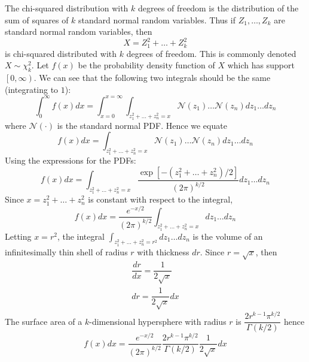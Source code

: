 \documentclass[11pt]{report} %
\begin{document}
The chi-squared distribution with $k$ degrees of freedom is the distribution of the sum of squares of $k$ standard normal random variables. Thus if $Z_{1}, \dots, Z_{k}$ are standard normal random variables, then
\begin{equation}
X = Z_{1}^{2} + \dots + Z_{k}^{2}
\end{equation}
is chi-squared distributed with $k$ degrees of freedom. This is commonly denoted $X \sim \chi_{k}^{2}$. Let $f\left(x\right)$ be the probability density function of $X$ which has support $\left[0, \infty\right)$. We can see that the following two integrals should be the same (integrating to $1$):
\begin{equation}
\int_{0}^{\infty}f\left(x\right)dx = \int_{x = 0}^{x = \infty}\int_{z_{1}^{2} + \dots + z_{n}^{2} = x}\mathcal{N}\left(z_{1}\right)\dots\mathcal{N}\left(z_{n}\right)dz_{1}\dots dz_{n}
\end{equation}
where $\mathcal{N}\left(\cdot\right)$ is the standard normal PDF. Hence we equate
\begin{equation}
f\left(x\right)dx = \int_{z_{1}^{2} + \dots + z_{n}^{2} = x}\mathcal{N}\left(z_{1}\right)\dots\mathcal{N}\left(z_{n}\right)dz_{1}\dots dz_{n}
\end{equation}
Using the expressions for the PDFs:
\begin{equation}
f\left(x\right)dx = \int_{z_{1}^{2} + \dots + z_{n}^{2} = x}\dfrac{\exp\left[-\left(z_{1}^{2} + \dots + z_{n}^{2}\right)/2\right]}{\left(2\pi\right)^{k/2}}dz_{1}\dots dz_{n}
\end{equation}
Since $x = z_{1}^{2} + \dots + z_{n}^{2}$ is constant with respect to the integral,
\begin{equation}
f\left(x\right)dx = \dfrac{e^{-x/2}}{\left(2\pi\right)^{k/2}}\int_{z_{1}^{2} + \dots + z_{n}^{2} = x}dz_{1}\dots dz_{n}
\end{equation}
Letting $x = r^{2}$, the integral $\int_{z_{1}^{2} + \dots + z_{n}^{2} = r^{2}}dz_{1}\dots dz_{n}$ is the volume of an infinitesimally thin shell of radius $r$ with thickness $dr$. Since $r = \sqrt{x}$, then
\begin{gather}
\dfrac{dr}{dx} = \dfrac{1}{2\sqrt{x}} \\
dr = \dfrac{1}{2\sqrt{x}}dx
\end{gather}
The surface area of a $k$-dimensional hypersphere with radius $r$ is $\dfrac{2r^{k-1}\pi^{k/2}}{\Gamma\left(k/2\right)}$ hence
\begin{equation}
f\left(x\right)dx = \dfrac{e^{-x/2}}{\left(2\pi\right)^{k/2}}\dfrac{2r^{k-1}\pi^{k/2}}{\Gamma\left(k/2\right)}\dfrac{1}{2\sqrt{x}}dx
\end{equation}
\end{document}
